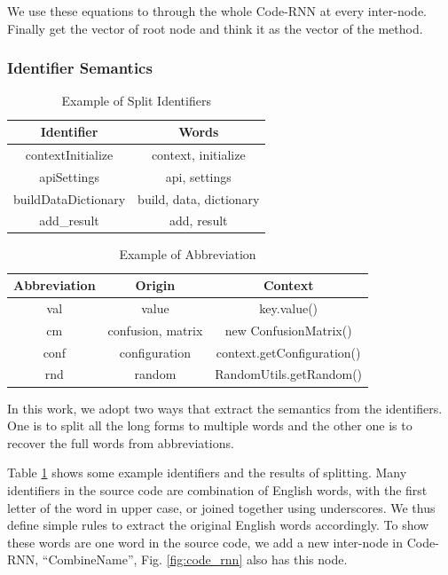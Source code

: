 We use these equations to through the whole Code-RNN at every inter-node. Finally get the vector of root node and think it as the vector of the method.

\subsubsection{Identifier Semantics}\label{sec:identifier}

\begin{table}[th]
\centering
\scriptsize{
\caption{\label{table:splitID} Example of Split Identifiers}
\begin{tabular}{|c|c|}
\hline
Identifier & Words \\
\hline
contextInitialize & context, initialize\\
\hline
apiSettings & api, settings\\
\hline
buildDataDictionary & build, data, dictionary\\
\hline
add\_result & add, result\\
\hline
\end{tabular}
}
\end{table}

\begin{table}[ht]
\centering
\scriptsize{
\caption{Example of Abbreviation}
\label{table:abbr}
\begin{tabular}{|c|c|c|}
\hline
Abbreviation & Origin & Context\\
\hline
val & value & key.value()\\
\hline
cm & confusion, matrix & new ConfusionMatrix()\\
\hline
conf & configuration & context.getConfiguration()\\
\hline
rnd & random & RandomUtils.getRandom()\\
\hline
\end{tabular}
}
\end{table}

In this work, we adopt two ways that extract the semantics from the identifiers.
One is to split all the long forms to multiple words and
the other one is to recover the full words from abbreviations.

Table \ref{table:splitID} shows some example identifiers and the results
of splitting. Many identifiers in the source code are combination of English words,
with the first letter of the word in upper case, or joined together using
underscores. We thus define simple rules to extract the original
English words accordingly.
To show these words are one word in the source code, we add a new inter-node in Code-RNN, ``CombineName'', Fig. \ref{fig:code_rnn} also has this node.

